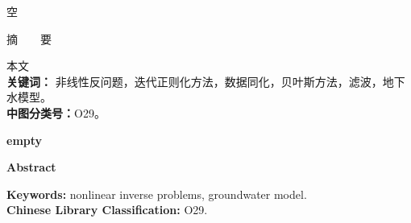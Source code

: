 \documentclass[main]{subfiles}
\begin{document}
\newpage


\centerline{空}
\vspace{6mm}

\centerline{\heiti 摘\ \ \ \ 要}
\vspace{2mm}

本文
\\
{\bf 关键词：} 非线性反问题，迭代正则化方法，数据同化，贝叶斯方法，滤波，地下水模型。\\
{\bf 中图分类号：}\quad O29。


\newpage


\centerline{\large\bf empty}
\vspace{6mm}

\centerline{\bf\large Abstract}
\vspace{2mm}

{\bf Keywords: }  nonlinear inverse problems, groundwater model.\\
{\bf Chinese Library Classification: }\quad O29.
\end{document}
